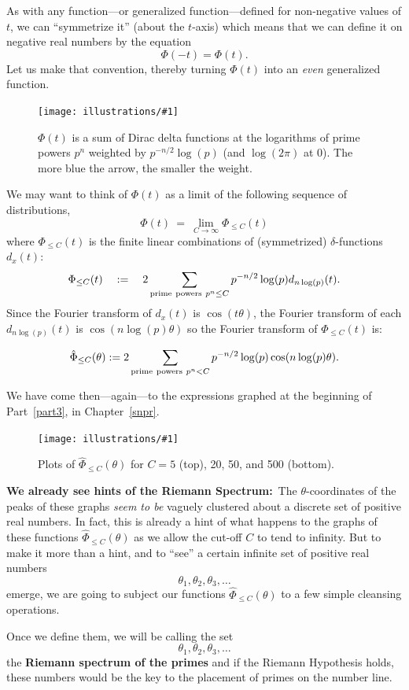 \documentclass[openany]{book}
\newcommand{\ill}[3]{%
   \begin{figure}[H]%
   \vspace{-2ex}
   \centering%
   \texttt{[image: illustrations/\#1]}%
   \caption{#3}%
   \vspace{-2ex}
    \end{figure}}
\theoremstyle{plain}
\theoremstyle{definition}
\begin{document}
   
As with any function---or generalized function---defined for
non-negative values of $t$, we can ``symmetrize it'' (about the
$t$-axis) which means that we can define it on negative real numbers
by the equation
  $$\Phi(-t) = \Phi(t).$$  
  Let us make that convention, thereby turning $\Phi(t)$ into an {\it
    even} generalized function.

  \ill{bigPhi}{1}{$\Phi(t)$ is a sum of Dirac delta functions at the
    logarithms of prime powers $p^n$ weighted by $p^{-n/2}\log(p)$
    (and $\log(2\pi)$ at $0$).  The more blue the arrow, the smaller
    the weight.}

  
We may want to think of $\Phi(t)$ as a limit of the following sequence of distributions,
 $$\Phi(t)\ = \ \lim_{C \to {\infty}}\Phi_{\le C}(t)$$ 
where $\Phi_{\le C}(t)$  is the finite linear 
combinations of (symmetrized) $\delta$-functions  $d_x(t)$:
 $$\Phi_{\le C}(t)\quad :=\quad  2\sum_{{\rm prime\ powers \ }p^n  \le C} p^{-n/2}\log(p)d_{n\log(p)}(t).$$
 Since the Fourier transform of $d_x(t)$ is  $\cos(t\theta)$, the Fourier transform of  each $d_{n\log(p)}(t)$ is
 $\cos(n\log(p)\theta)$ so the Fourier transform of $\Phi_{\le
   C}(t)$ is:
  
  $${\hat \Phi}_{\le C}(\theta):= 2\sum_{{\rm prime\ powers\ }p^n <C} p^{-n/2} \log(p)\cos(n\log(p)\theta).$$
  
  
  We have come then---again---to the expressions graphed at the beginning of Part~\ref{part3}, in 
  Chapter~\ref{snpr}.
  
  
 \ill{phihat_even_all}{1}{Plots of ${\hat \Phi}_{\le C}(\theta)$ for
 $C=5$ (top), 20, 50, and 500 (bottom).\label{fig:phic}}



{\bf We already see hints of the Riemann Spectrum:}\ The
$\theta$-coordinates of the peaks of these graphs {\it seem to be}
vaguely clustered about a discrete set of positive real numbers. In
fact, this is already a hint of what happens to the graphs of these
functions ${\hat\Phi}_{\le C}(\theta)$ as we allow the cut-off $C$ to
tend to infinity.  But to make it more than a hint, and to ``see'' a
certain infinite set of positive real numbers
$$\theta_1,\theta_2,\theta_3,\dots$$ emerge,  we are going to subject our functions ${\hat\Phi}_{\le C}(\theta)$ to a few simple cleansing operations. 

Once we define them, we will be calling the
set $$\theta_1,\theta_2,\theta_3,\dots$$ the {\bf Riemann spectrum of
  the primes} and if the Riemann Hypothesis holds, these numbers would
be the key to the placement of primes on the number line.
\end{document}
